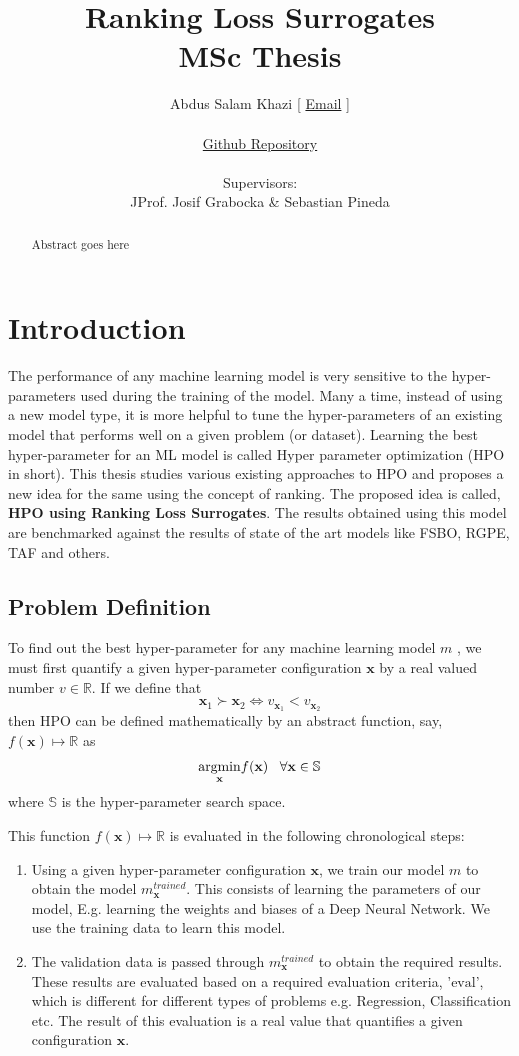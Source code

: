 \documentclass[11pt]{article}
\title {Ranking Loss Surrogates \\[1ex] \large MSc Thesis}
\author{
        Abdus Salam Khazi [
        \href{mailto:abdus.khazi@students.uni-freiburg.de}
                {Email} ]\\ \\
        \href{https://github.com/abduskhazi/ranking-loss-surrogates.git}
                {Github Repository} \cite{github_repository} \\ \\
        Supervisors:
        \begin{tabular}{ll}
             JProf. Josif Grabocka \&
			Sebastian Pineda
		\end{tabular}
       }
\begin{document}
\maketitle
\date{}
\tableofcontents
\newpage

\begin{abstract}

Abstract goes here

\end{abstract}

\newpage

\section{Introduction}
The performance of any machine learning model is very sensitive to the hyper-parameters used during the training of the model. 
Many a time, instead of using a new model type, it is more helpful to tune the hyper-parameters of an existing model that performs well on a given problem (or dataset).
Learning the best hyper-parameter for an ML model is called Hyper parameter optimization (HPO in short).
This thesis studies various existing approaches to HPO and proposes a new idea for the same using the concept of ranking.
The proposed idea is called, \textbf{HPO using Ranking Loss Surrogates}. 
The results obtained using this model are benchmarked against the results of state of the art models like FSBO,  RGPE,  TAF and others. 

\subsection{Problem Definition}
To find out the best hyper-parameter for any machine learning model $m$ , we must first quantify a given hyper-parameter configuration $\textbf{x}$ by a real valued number $v \in \mathbb{R}$.  If we define that
$$
\textbf{x}_1 \succ  \textbf{x}_2 \iff v_{\textbf{x}_1} < v_{\textbf{x}_2}
$$
then HPO can be defined mathematically by an abstract function, say,  $f(\textbf{x}) \mapsto \mathbb{R}$ as
$$
     \underset{\rm \textbf{x}}{\rm argmin}  f(\textbf{x}) \;\;\;  \forall \textbf{x} \in \mathbb{S}
$$
where $\mathbb{S}$ is the hyper-parameter search space.

This function $f(\textbf{x}) \mapsto \mathbb{R}$ is evaluated in the following chronological steps:
\begin{enumerate}
\item Using a given hyper-parameter configuration $\textbf{x}$,  we train our model $m$ to obtain the model $m^{trained}_\textbf{x}$.   This consists of learning the parameters of our model, E.g.  learning the weights and biases of a Deep Neural Network.
We use the training data to learn this model.
\item The validation data is passed through $m^{trained}_\textbf{x}$ to obtain the required results.
These results are evaluated based on a required evaluation criteria, '$\textrm{eval}$', which is different for different types of problems e.g. Regression,  Classification etc.
The result of this evaluation is a real value that quantifies a given configuration $\textbf{x}$.
\end{enumerate}
\end{document}
